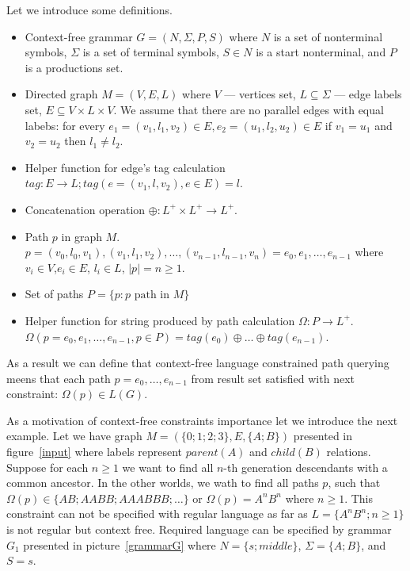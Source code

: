 \documentclass{sig-alternate} %
\begin{document}
Let we introduce some definitions.
\begin{itemize}
  \item Context-free grammar $G=(N, \Sigma, P, S)$ where $N$ is a set of nonterminal symbols, $\Sigma$ is a set of terminal symbols, $S \in N$ is a start nonterminal, and $P$ is a productions set. 
  \item Directed graph $M = (V,E,L)$ where $V$ --- vertices set, $L \subseteq \Sigma$ --- edge labels set, $E\subseteq V\times L\times V$. 
  We assume that there are no parallel edges with equal labebs: for every $e_1=(v_1,l_1,v_2) \in E, e_2=(u_1,l_2,u_2) \in E$ if $v_1 = u_1$ and $v_2 = u_2$ then $l_1 \neq l_2$.
  \item Helper function for edge's tag calculation $tag: E \rightarrow L; tag(e = (v_1,l,v_2), e \in E) = l$.
  \item Concatenation operation $\oplus: L^+ \times L^+ \rightarrow L^+$.
  \item Path $p$ in graph $M$. \\ $p = (v_0,l_0,v_1),(v_1,l_1,v_2),\dots,(v_{n-1},l_{n-1},v_n) = e_0,e_1,\dots,e_{n-1}$ where $v_i \in V$,$e_i \in E$, $l_i \in L$, $|p| = n \geq 1$. 
  \item Set of paths $P = \{p: p \text{ path in } M\}$
  \item Helper function for string produced by path calculation $\Omega: P \rightarrow L^+$.\\ $\Omega(p = e_0,e_1,\dots,e_{n-1}, p \in P) = tag (e_0) \oplus \dots \oplus tag (e_{n-1})$.
\end{itemize}

As a result we can define that context-free language constrained path querying meens that each path $p = e_0,\dots,e_{n-1}$ from result set satisfied with next constraint: $\Omega(p) \in L(G)$. 

As a motivation of context-free constraints importance let we introduce the next example.
Let we have graph $M=(\{0;1;2;3\},E,\{A;B\})$ presented in figure~\ref{input} where labels represent $parent (A)$ and $child (B)$ relations. 
Suppose for each $n \geq 1$ we want to find all $n$-th generation descendants with a common ancestor.
In the other worlds, we wath to find all paths $p$, such that $\Omega(p) \in \{AB; AABB; AAABBB; \dots\}$ or $\Omega(p) = A^n B^n$ where $n \geq 1$.
This constraint can not be specified with regular language as far as $L=\{A^n B^n; n \geq 1\}$ is not regular but context free.
Required language can be specified by grammar $G_1$ presented in picture~\ref{grammarG} where $N = \{s; middle\}$, $\Sigma = \{A; B\}$, and $S = s$.
\end{document}
